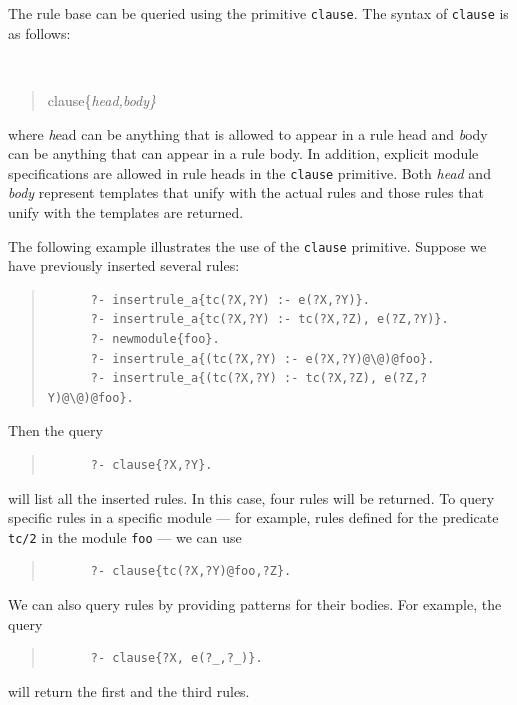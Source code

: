 \documentclass[11pt]{article}
\begin{document}
The rule base can be queried using the primitive {\tt clause}.  The
  syntax of {\tt clause} is as follows:

{\tt
\begin{quote}
clause\{\it{head,body}\}
\end{quote}
}
\noindent
where {\emph head} can be anything that is allowed to appear in a rule
head and {\emph body} can be anything that
can appear in a rule body. In addition, explicit module specifications are
allowed in rule heads in the {\tt clause} primitive. 
Both \emph{head} and \emph{body} represent
templates that unify with the actual rules and those rules that unify
with the templates are returned.

The following example illustrates the use of the {\tt clause} primitive.
Suppose we have previously inserted several rules:
\begin{quote}
\begin{verbatim}
      ?- insertrule_a{tc(?X,?Y) :- e(?X,?Y)}.
      ?- insertrule_a{tc(?X,?Y) :- tc(?X,?Z), e(?Z,?Y)}.
      ?- newmodule{foo}.
      ?- insertrule_a{(tc(?X,?Y) :- e(?X,?Y)@\@)@foo}.
      ?- insertrule_a{(tc(?X,?Y) :- tc(?X,?Z), e(?Z,?Y)@\@)@foo}.
\end{verbatim}
\end{quote}

Then the query
\begin{quote}
\begin{verbatim}
      ?- clause{?X,?Y}.
\end{verbatim}
\end{quote}
\noindent
will list all the inserted rules.  In this case, four rules will be
returned.  To query specific rules in a specific module --- for example,
rules defined for the predicate {\tt tc/2} in the module {\tt foo} --- we
can use
\begin{quote}
\begin{verbatim}
      ?- clause{tc(?X,?Y)@foo,?Z}.
\end{verbatim}
\end{quote}
We can also query rules by providing patterns for their bodies. For
example, the query
\begin{quote}
\begin{verbatim}
      ?- clause{?X, e(?_,?_)}.
\end{verbatim}
\end{quote}
\noindent
will return the first and the third rules.
\end{document}
